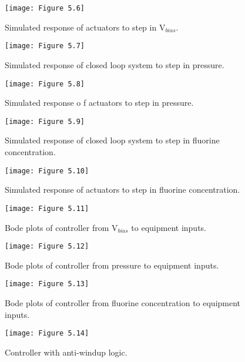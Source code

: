 \begin{figure}[H]
	\centering
	\texttt{[image: Figure 5.6]}
	\bf\caption{  Simulated response of actuators to step in $\text{V}_{bias}$.}
	\label{fig:5.6}
\end{figure}

\begin{figure}[H]
	\centering
	\texttt{[image: Figure 5.7]}
	\bf\caption{  Simulated response of closed loop system to step in pressure.}
	\label{fig:5.7}
\end{figure}

\begin{figure}[H]
	\centering
	\texttt{[image: Figure 5.8]}
	\bf\caption{  Simulated response o f actuators to step in pressure.}
	\label{fig:5.8}
\end{figure}

\begin{figure}[H]
	\centering
	\texttt{[image: Figure 5.9]}
	\bf\caption{  Simulated response of closed loop system to step in fluorine	concentration.}
	\label{fig:5.9}
\end{figure}

\begin{figure}[H]
	\centering
	\texttt{[image: Figure 5.10]}
	\bf\caption{  Simulated response of actuators to step in fluorine concentration.}
	\label{fig:5.10}
\end{figure}

\begin{figure}[H]
	\centering
	\texttt{[image: Figure 5.11]}
	\bf\caption{  Bode plots of controller from $\text{V}_{bias}$ to equipment inputs.}
	\label{fig:5.11}
\end{figure}

\begin{figure}[H]
	\centering
	\texttt{[image: Figure 5.12]}
	\bf\caption{  Bode plots of controller from pressure to equipment inputs.}
	\label{fig:5.12}
\end{figure}

\begin{figure}[H]
	\centering
	\texttt{[image: Figure 5.13]}
	\bf\caption{  Bode plots of controller from fluorine concentration to equipment inputs.}
	\label{fig:5.13}
\end{figure}

\begin{figure}[H]
	\centering
	\texttt{[image: Figure 5.14]}
	\bf\caption{  Controller with anti-windup logic.}
	\label{fig:5.14}
\end{figure}

